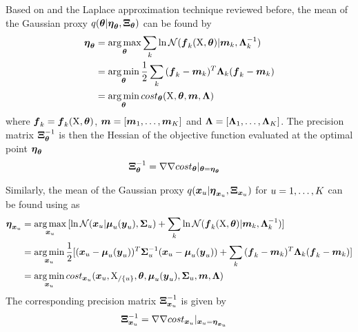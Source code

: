 Based on  and the Laplace approximation technique reviewed before, the mean of the Gaussian proxy $q(\boldsymbol{\theta}\vert\boldsymbol{\eta}_{\boldsymbol{\theta}},\boldsymbol{\Xi}_{\boldsymbol{\theta}})$ can be found by
\begin{align}
    \dymetatheta
    & = 
    \argmax_{\dymtheta}{
        \sum_k{
            \ln{\mathcal{N}(\dymfkX{k}\vert\dymmk{k},\dyminvLambdak{k})}
        }}
    \nonumber
    \\
    & =
    \argmin_{\dymtheta}{
        \frac{1}{2}\sum_k{
            (\dymfkXshort{k} - \dymmk{k})^T\dymLambdak{k}(\dymfkXshort{k} - \dymmk{k})
        }
    }
    \nonumber
    \\
    & = 
    \argmin_{\dymtheta}{
        cost_{\dymtheta}(\dymX,\dymtheta,\dymm,\dymLambda)
    }
    \label{eq-laplace-theta-cost}
\end{align}
where $\boldsymbol{f}_{k} = \boldsymbol{f}_{k}(\mathrm{X}, \boldsymbol{\theta})$, $\boldsymbol{m} = [\boldsymbol{m}_{1},\dots,\boldsymbol{m}_{K}]$ and $\boldsymbol{\Lambda} = [\boldsymbol{\Lambda}_{1},\dots,\boldsymbol{\Lambda}_{K}]$.
The precision matrix $\boldsymbol{\Xi}_{\boldsymbol{\theta}}^{-1}$ is then the Hessian of the objective function   evaluated at the optimal point $\boldsymbol{\eta}_{\boldsymbol{\theta}}$
\begin{align}
    \dymXitheta^{-1} 
    & = 
    \nabla\nabla cost_{\dymtheta}\vert_{\dymtheta = \dymetatheta}  
    \label{eq-laplace-theta-covariance}    
\end{align}

Similarly, the mean of the Gaussian proxy $q(\boldsymbol{x}_{u}\vert\boldsymbol{\eta}_{\boldsymbol{x}_{u}},\boldsymbol{\Xi}_{\boldsymbol{x}_{u}})$ for $u = 1,\dots,K$ can be found using  as 
\begin{align}
    \dymetaxk{u}
    & =     
    \argmax_{\dymxk{u}}{[
        \ln{\mathcal{N}(\dymxk{u}\vert\dymmuk{u},\dymSigmak{u})} 
        + \sum_k{
            \ln{\mathcal{N}(\dymfkX{k}\vert\dymmk{k},\dyminvLambdak{k})}
        }]}
    \nonumber
    \\
    & =
    \argmin_{\dymxk{u}}{
        \frac{1}{2}[(\dymxk{u} - \dymmuk{u})^T\dyminvSigmak{u}(\dymxk{u} - \dymmuk{u})
        + \sum_k{
            (\dymfkXshort{k} - \dymmk{k})^T\dymLambdak{k}(\dymfkXshort{k} - \dymmk{k})        
        }]
    }
    \nonumber
    \\
    & =
    \argmin_{\dymxk{u}}{
        cost_{\dymxk{u}}(\dymxk{u},\dymXwithoutk{u},\dymtheta,\dymmuk{u},\dymSigmak{u},\dymm,\dymLambda)
    }
    \label{eq-laplace-xu-cost}
\end{align}
The corresponding precision matrix $\boldsymbol{\Xi}_{\boldsymbol{x}_{u}}^{-1}$ is given by 
\begin{align}
    \dymXixk{u}^{-1} 
    & = 
    \nabla\nabla cost_{\dymxk{u}}\vert_{\dymxk{u} = \dymetaxk{u}}
    \label{eq-laplace-xu-covariance}
\end{align}

